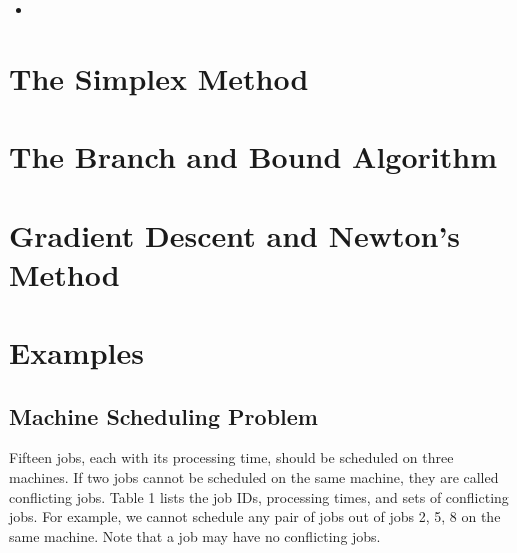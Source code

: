 \documentclass[letterpaper,10pt,english]{sphinxmanual}
\begin{document}
\begin{sphinxShadowBox}
\begin{itemize}
\begin{itemize}
\begin{itemize}
\item {} 
\sphinxAtStartPar
{}\label{\detokenize{OperationsResearch/OptimizationAlgorithms:id10}}{\hyperref[\detokenize{OperationsResearch/OptimizationAlgorithms:facility-location-problem}]{}}

\end{itemize}

\end{itemize}

\end{itemize}
\end{sphinxShadowBox}


\section{The Simplex Method}
\label{\detokenize{OperationsResearch/OptimizationAlgorithms:the-simplex-method}}

\section{The Branch and Bound Algorithm}
\label{\detokenize{OperationsResearch/OptimizationAlgorithms:the-branch-and-bound-algorithm}}

\section{Gradient Descent and Newton’s Method}
\label{\detokenize{OperationsResearch/OptimizationAlgorithms:gradient-descent-and-newton-s-method}}

\section{Examples}
\label{\detokenize{OperationsResearch/OptimizationAlgorithms:examples}}

\subsection{Machine Scheduling Problem}
\label{\detokenize{OperationsResearch/OptimizationAlgorithms:machine-scheduling-problem}}
\sphinxAtStartPar
Fifteen jobs, each with its processing time, should be scheduled on three machines.
If two jobs cannot be scheduled on the same machine, they are called conflicting jobs.
Table 1 lists the job IDs, processing times, and sets of conflicting jobs.
For example, we cannot schedule any pair of jobs out of jobs 2, 5, 8 on the same machine.
Note that a job may have no conflicting jobs.
\end{document}
